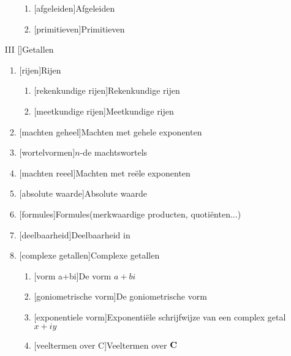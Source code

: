 \documentclass{article}
\begin{document}
\begin{itemize}
\begin{enumerate}
\begin{enumerate}
\item {}[afgeleiden]{Afgeleiden}
\item {}[primitieven]{Primitieven}
\end{enumerate}%
\end{enumerate}%
\item[III] []{Getallen}
\begin{enumerate}%
\item {}[rijen]{Rijen}
\begin{enumerate}%
\item {}[rekenkundige rijen]{Rekenkundige rijen}
\item {}[meetkundige rijen]{Meetkundige rijen}
\end{enumerate}%
\item {}[machten geheel]{Machten met gehele exponenten}
\item {}[wortelvormen]{$n$-de machtswortels}
\item {}[machten reeel]{Machten met re\"ele exponenten}
\item {}[absolute waarde]{Absolute waarde}
\item {}[formules]{Formules(merkwaardige producten, quoti\"enten...)}
\item {}[deelbaarheid]{Deelbaarheid in \Z}
\item {}[complexe getallen]{Complexe getallen}
\begin{enumerate}%
\item {}[vorm a+bi]{De vorm $a+bi$}
\item {}[goniometrische vorm]{De goniometrische vorm}
\item {}[exponentiele vorm]{Exponenti\"ele schrijfwijze van een complex getal $x+iy$}
\item {}[veeltermen over C]{Veeltermen over $\mbox{$\bf C $}$}
\end{enumerate}%

\end{enumerate}
\end{itemize}
\end{document}
